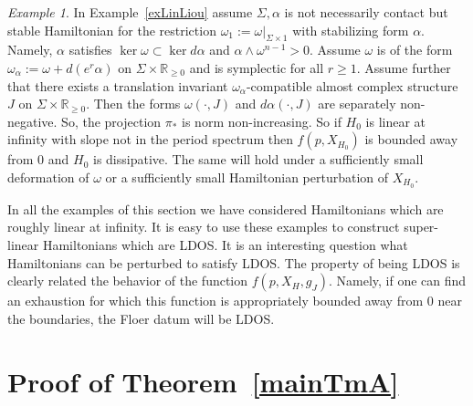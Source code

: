 \documentclass[11pt]{amsart}
\newcommand{\R}{\mathbb{R}}
\theoremstyle{definition}
\theoremstyle{remark}
\newtheorem{ex}[tm]{Example}
\begin{document}
\begin{ex}
In Example~\ref{exLinLiou} assume $\Sigma,\alpha$ is not necessarily contact but stable Hamiltonian for the restriction $\omega_1:=\omega|_{\Sigma\times 1}$ with stabilizing form $\alpha$. Namely, $\alpha$ satisfies $\ker\omega\subset \ker d\alpha$ and $\alpha\wedge\omega^{n-1}>0$. Assume $\omega$ is of the form $\omega_{\alpha}:=\omega+d(e^r\alpha)$ on $\Sigma\times\R_{\geq0}$ and is symplectic for all $r\geq 1$. Assume further that there exists a translation invariant $\omega_{\alpha}$-compatible almost complex structure $J$ on $\Sigma\times\R_{\geq 0}$. Then the forms $\omega(\cdot,J)$ and $d\alpha(\cdot,J)$ are separately non-negative. So, the projection $\pi_*$ is norm non-increasing. So if $H_0$ is linear at infinity with slope not in the period spectrum then $f(p,X_{H_0})$ is bounded away from $0$ and $H_0$ is dissipative. The same will hold under a sufficiently small deformation of $\omega$ or a sufficiently small Hamiltonian perturbation of $X_{H_0}$.
\end{ex}

In all the examples of this section we have considered Hamiltonians which are roughly linear at infinity. It is easy to use these examples to construct super-linear Hamiltonians which are LDOS. It is an interesting question what Hamiltonians can be perturbed to satisfy LDOS. The property of being LDOS is clearly related the behavior of the function $f(p,X_H,g_J)$. Namely, if one can find an exhaustion for which this function is appropriately bounded away from $0$ near the boundaries, the Floer datum will be LDOS.
\section{Proof of Theorem~\ref{mainTmA}}\label{Sec6}
\end{document}
